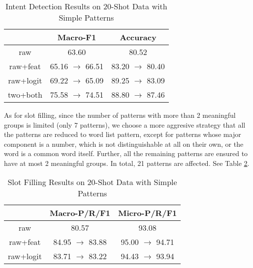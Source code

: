 \begin{table}
\setlength{\tabcolsep}{0.23em}
\centering
\small{
\begin{tabular}{|c|c|c|}

\hline
  & Macro-F1 & Accuracy  \\
\hline
raw & 63.60 & 80.52 \\
\hline
raw+feat & 65.16 $\rightarrow$ 66.51 & 83.20 $\rightarrow$ 80.40 \\
\hline
raw+logit & 69.22 $\rightarrow$ 65.09 & 89.25 $\rightarrow$ 83.09  \\
\hline
two+both & 75.58 $\rightarrow$ 74.51 & 88.80 $\rightarrow$ 87.46 \\
\hline 
\end{tabular}
}
\caption{Intent Detection Results on 20-Shot Data with Simple Patterns}
\label{simple_intent}
\end{table}


As for slot filling, since the number of patterns with more than 2 meaningful groups is limited (only 7 patterns), we choose a more aggresive strategy that all the patterns are reduced to word list pattern, except for patterns whose major component is a number, which is not distinguishable at all on their own, or the word is a common word itself. Further, all the remaining patterns are ensured to have at most 2 meaningful groups. In total, 21 patterns are affected. See Table \ref{simple_slot}.

\begin{table}
\setlength{\tabcolsep}{0.23em}
\centering
\small{
\begin{tabular}{|c|c|c|}

\hline
  & Macro-P/R/F1 & Micro-P/R/F1  \\
\hline
raw & 80.57 & 93.08 \\
\hline
raw+feat & 84.95 $\rightarrow$ 83.88 & 95.00 $\rightarrow$ 94.71 \\
\hline
raw+logit & 83.71 $\rightarrow$ 83.22 & 94.43 $\rightarrow$ 93.94  \\
\hline 
\end{tabular}
}
\caption{Slot Filling Results on 20-Shot Data with Simple Patterns}
\label{simple_slot}
\end{table}




